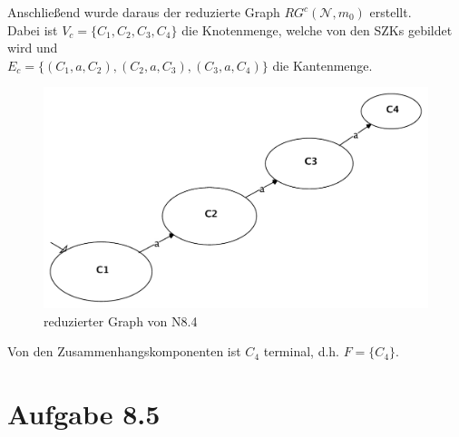 \documentclass[12pt, paper=a4]{article}
\begin{document}
Anschlie{\ss}end wurde daraus der reduzierte Graph \(RG^c(\mathcal{N},m_0)\) erstellt.\\
Dabei ist \(V_c = \{C_1,C_2,C_3,C_4\}\) die Knotenmenge, welche von den SZKs gebildet wird und\\
\(E_c = \{(C_1,a,C_2), (C_2,a,C_3), (C_3,a,C_4)\}\) die Kantenmenge.

\begin{figure}[h!]
\centering
\includegraphics[scale=0.4]{8_4RGc.pdf}
\caption{reduzierter Graph von N8.4}
\end{figure}

Von den Zusammenhangskomponenten ist \(C_4\) terminal, d.h. \(F=\{C_4\}\).

\section*{Aufgabe 8.5}
\end{document}
